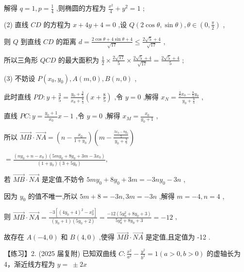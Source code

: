 \documentclass[10pt]{article}
\begin{document}
解得 \(q = 1,p = \frac{1}{4}\) ,则椭圆的方程为 \(\frac{{x}^{2}}{4} + {y}^{2} = 1\) ;

(2) 直线 \({CD}\) 的方程为 \(x + {4y} + 4 = 0\) ,设 \(Q\left( {2\cos \theta ,\sin \theta }\right) ,\theta  \in  \left( {0,\frac{\pi }{2}}\right)\) ,

则 \(Q\) 到直线 \({CD}\) 的距离 \(d = \frac{2\cos \theta  + 4\sin \theta  + 4}{\sqrt{17}} \leq  \frac{2\sqrt{5} + 4}{\sqrt{17}}\) ,

所以三角形 \({QCD}\) 的最大面积为 \(\frac{1}{2} \times  \frac{2\sqrt{17}}{5} \times  \frac{2\sqrt{5} + 4}{\sqrt{17}} = \frac{2\sqrt{5} + 4}{5}\) ;

(3) 不妨设 \(P\left( {{x}_{0},{y}_{0}}\right) ,A\left( {m,0}\right) ,B\left( {n,0}\right)\) ,

此时直线 \({PD} : y + \frac{3}{5} = \frac{{y}_{0} + \frac{3}{5}}{{x}_{0} + \frac{8}{5}}\left( {x + \frac{8}{5}}\right)\) ,令 \(y = 0\) ,解得 \({x}_{N} = \frac{\frac{3}{5}{x}_{0} - \frac{8}{5}{y}_{0}}{{y}_{0} + \frac{3}{5}}\) ,

直线 \({PC} : y = \frac{{y}_{0} + 1}{{x}_{0}}x - 1\) ,令 \(y = 0\) ,解得 \({x}_{M} = \frac{{x}_{0}}{{y}_{0} + 1}\) ,

所以 \(\overrightarrow{MB} \cdot  \overrightarrow{NA} = \left( {n - \frac{{x}_{0}}{1 + {y}_{0}}}\right) \left( {m - \frac{\frac{3{x}_{0} - 8{y}_{0}}{5}}{{y}_{0} + \frac{3}{5}}}\right)\)

\(= \frac{\left( {n{y}_{0} + n - {x}_{0}}\right) \left( {{5m}{y}_{0} + 8{y}_{0} + {3m} - 3{x}_{0}}\right) }{\left( {1 + {y}_{0}}\right) \left( {3 + 5{y}_{0}}\right) },\)

若 \(\overrightarrow{MB} \cdot  \overrightarrow{NA}\) 是定值,不妨令 \({5m}{y}_{0} + 8{y}_{0} + {3m} =  - {3n}{y}_{0} - {3n}\) ,

因为 \({y}_{0}\) 的值不唯一,所以 \({5m} + 8 =  - {3n},{3m} =  - {3n}\) ,解得 \(m =  - 4,n = 4\) ,

则 \(\overrightarrow{MB} \cdot  \overrightarrow{NA} = \frac{-3\left\lbrack  {{\left( 4{y}_{0} + 4\right) }^{2} - {x}_{0}^{2}}\right\rbrack  }{\left( {{y}_{0} + 1}\right) \left( {5{y}_{0} + 2}\right) } = \frac{-{12}\left( {5{y}_{0}^{2} + 8{y}_{0} + 3}\right) }{5{y}_{0}^{2} + 8{y}_{0} + 3} =  - {12}\) ,

故存在 \(A\left( {-4,0}\right)\) 和 \(B\left( {4,0}\right)\) ,使得 \(\overrightarrow{MB} \cdot  \overrightarrow{NA}\) 是定值,且定值为 -12 .

【练习】2. (2025 届复附) 已知双曲线 \(C : \frac{{x}^{2}}{{a}^{2}} - \frac{{y}^{2}}{{b}^{2}} = 1\left( {a > 0,b > 0}\right)\) 的虚轴长为 4，渐近线方程为 \(y = \; \pm  {2x}\)
\end{document}
